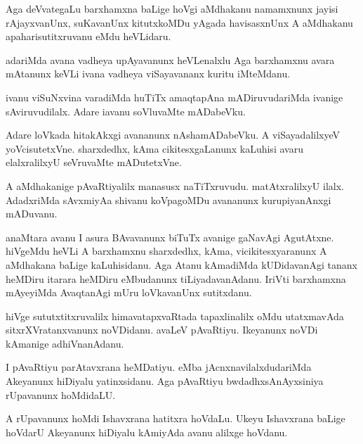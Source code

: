 \documentclass{article}
\begin{document}
\begin{mng}%
Aga deVvategaLu barxhamxna baLige hoVgi aMdhakanu namamxnunx jayisi rAjayxvanUnx, suKavanUnx 
kitutxkoMDu yAgada havisasxnUnx A aMdhakanu apaharisutitxruvanu eMdu heVLidaru.
\end{mng}

\begin{mng}%
adariMda avana vadheya upAyavanunx heVLenalxlu Aga barxhamxnu avara mAtanunx keVLi ivana vadheya 
viSayavananx kuritu iMteMdanu.
\end{mng}

\begin{mng}%
ivanu viSuNxvina varadiMda huTiTx amaqtapAna mADiruvudariMda ivanige sAviruvudilalx. Adare iavanu 
soVluvaMte mADabeVku.
\end{mng}

\begin{mng}%
Adare loVkada hitakAkxgi avananunx nAshamADabeVku. A viSayadalilxyeV yoVcisutetxVne. sharxdedhx, 
kAma cikitesxgaLanunx kaLuhisi avaru elalxralilxyU seVruvaMte mADutetxVne.
\end{mng}

\begin{mng}%
A aMdhakanige pAvaRtiyalilx manasusx naTiTxruvudu. matAtxralilxyU ilalx. AdadxriMda sAvxmiyAa 
shivanu koVpagoMDu avananunx kurupiyanAnxgi mADuvanu.
\end{mng}

\begin{mng}%
anaMtara avanu I asura BAvavanunx biTuTx avanige gaNavAgi AgutAtxne. hiVgeMdu heVLi A barxhamxnu 
sharxdedhx, kAma, vicikitesxyaranunx A aMdhakana baLige kaLuhisidanu. Aga Atanu kAmadiMda 
kUDidavanAgi tananx heMDiru itarara heMDiru eMbudanunx tiLiyadavanAdanu. IriVti barxhamxna 
mAyeyiMda AvaqtanAgi mUru loVkavanUnx sutitxdanu.
\end{mng}

\begin{mng}%
hiVge sututxtitxruvalilx himavatapxvaRtada tapaxlinalilx oMdu utatxmavAda sitxrXVratanxvanunx 
noVDidanu. avaLeV pAvaRtiyu. Ikeyanunx noVDi kAmanige adhiVnanAdanu.
\end{mng}

\begin{mng}%
I pAvaRtiyu parAtavxrana heMDatiyu. eMba jAcnxnavilalxdudariMda Akeyanunx hiDiyalu yatinxsidanu. 
Aga pAvaRtiyu bwdadhxsAnAyxsiniya rUpavanunx hoMdidaLU.
\end{mng}

\begin{mng}%
A rUpavanunx hoMdi Ishavxrana hatitxra hoVdaLu. Ukeyu Ishavxrana baLige hoVdarU Akeyanunx hiDiyalu 
kAmiyAda avanu alilxge hoVdanu.
\end{mng}
\end{document}

